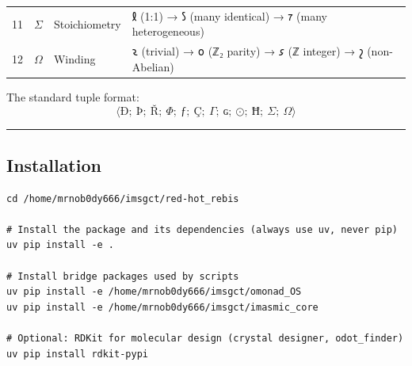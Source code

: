 \documentclass[12pt,a4paper]{article}
\begin{document}
\begin{longtable}[]{@{}llll@{}}
\begin{minipage}[t]{0.07\columnwidth}\raggedright
11\strut
\end{minipage} & \begin{minipage}[t]{0.24\columnwidth}\raggedright
\(Σ\)\strut
\end{minipage} & \begin{minipage}[t]{0.13\columnwidth}\raggedright
Stoichiometry\strut
\end{minipage} & \begin{minipage}[t]{0.44\columnwidth}\raggedright
𐑙 (1:1) → 𐑕 (many identical) → 𐑳 (many heterogeneous)\strut
\end{minipage}\tabularnewline
\begin{minipage}[t]{0.07\columnwidth}\raggedright
12\strut
\end{minipage} & \begin{minipage}[t]{0.24\columnwidth}\raggedright
\(Ω\)\strut
\end{minipage} & \begin{minipage}[t]{0.13\columnwidth}\raggedright
Winding\strut
\end{minipage} & \begin{minipage}[t]{0.44\columnwidth}\raggedright
𐑷 (trivial) → 𐑴 (ℤ₂ parity) → 𐑭 (ℤ integer) → 𐑟 (non-Abelian)\strut
\end{minipage}\tabularnewline
\bottomrule
\end{longtable}

The standard tuple format:
\[\langle Ð;\ Þ;\ Ř;\ Φ;\ ƒ;\ Ç;\ Γ;\ ɢ;\ ⊙;\ Ħ;\ Σ;\ Ω \rangle\]

\begin{center}\rule{0.5\linewidth}{0.5pt}\end{center}

\hypertarget{installation}{%
\subsection{Installation}\label{installation}}

\begin{verbatim}
cd /home/mrnob0dy666/imsgct/red-hot_rebis

# Install the package and its dependencies (always use uv, never pip)
uv pip install -e .

# Install bridge packages used by scripts
uv pip install -e /home/mrnob0dy666/imsgct/omonad_OS
uv pip install -e /home/mrnob0dy666/imsgct/imasmic_core

# Optional: RDKit for molecular design (crystal designer, odot_finder)
uv pip install rdkit-pypi
\end{verbatim}
\end{document}
